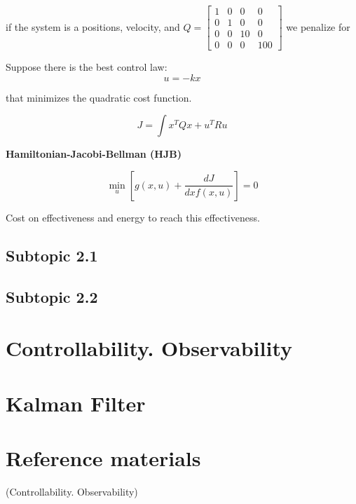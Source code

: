 \documentclass{article}
\begin{document}
if the system is a positions, velocity, and \(Q = \begin{bmatrix} 1 & 0 & 0 & 0 \\ 0 & 1 & 0 & 0 \\ 0 & 0 & 10 & 0 \\ 0 & 0 & 0 & 100 \end{bmatrix}\) we penalize for 

Suppose there is the best control law:
\[u = -kx\]

that minimizes the quadratic cost function.

\[J = \int x^T Q x + u^T R u\]

\textbf{Hamiltonian-Jacobi-Bellman (HJB)}

\[\min_u [g(x, u) + \frac{dJ}{dx f(x, u)}] = 0\]

Cost on effectiveness and energy to reach this effectiveness.

\subsection{Subtopic 2.1}

\subsection{Subtopic 2.2}






\section{Controllability. Observability}





\section{Kalman Filter}



\section{Reference materials}


(Controllability. Observability)




\end{document}
